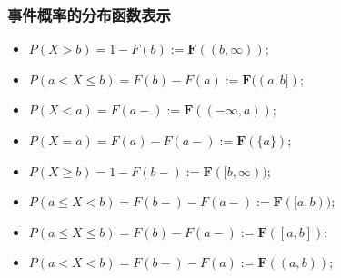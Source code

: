 \begin{frame}
	\frametitle{事件概率的分布函数表示}
	\begin{itemize}[<+-|alert@+>]
		\item $P(X> b)=1-F(b):=\mathbf{F}((b,\infty))$;
		\item $P(a< X\le b)=F(b)-F(a):=\mathbf{F}((a,b])$;

		\item $P(X<a)=F(a-):=\mathbf{F}((-\infty, a))$;

		\item $P(X=a)=F(a)-F(a-):=\mathbf{F}(\{a\})$;
		\item $P(X\ge b)=1-F(b-):=\mathbf{F}([b,\infty))$;

		\item $P(a\le X<b)=F(b-)-F(a-):=\mathbf{F}([a,b))$;
		\item $P(a\le X\le b)=F(b)-F(a-):=\mathbf{F}([a,b])$;
		\item $P(a< X<b)=F(b-)-F(a):=\mathbf{F}((a,b))$;

	\end{itemize}
\end{frame}

